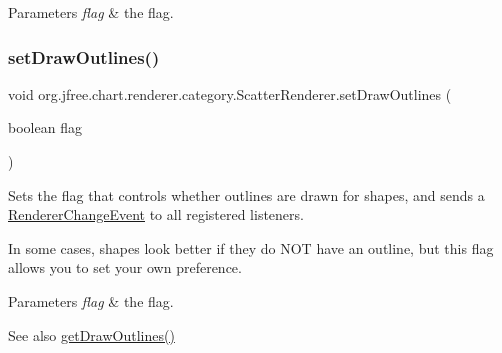 \begin{DoxyParams}{Parameters}
{\em flag} & the flag. \\
\hline
\end{DoxyParams}
\mbox{\label{classorg_1_1jfree_1_1chart_1_1renderer_1_1category_1_1_scatter_renderer_a7abfe3403b5c744918c537dcf97dd09b}} 
\subsubsection{\texorpdfstring{set\+Draw\+Outlines()}{setDrawOutlines()}}
{\footnotesize\ttfamily void org.\+jfree.\+chart.\+renderer.\+category.\+Scatter\+Renderer.\+set\+Draw\+Outlines (\begin{DoxyParamCaption}\item[{boolean}]{flag }\end{DoxyParamCaption})}

Sets the flag that controls whether outlines are drawn for shapes, and sends a \mbox{\hyperlink{}{Renderer\+Change\+Event}} to all registered listeners. 

In some cases, shapes look better if they do N\+OT have an outline, but this flag allows you to set your own preference.


\begin{DoxyParams}{Parameters}
{\em flag} & the flag.\\
\hline
\end{DoxyParams}
\begin{DoxySeeAlso}{See also}
\mbox{\hyperlink{classorg_1_1jfree_1_1chart_1_1renderer_1_1category_1_1_scatter_renderer_a0dac1c7119c34fe923357e583f3267c4}{get\+Draw\+Outlines()}} 
\end{DoxySeeAlso}
\mbox{\label{classorg_1_1jfree_1_1chart_1_1renderer_1_1category_1_1_scatter_renderer_a4415e005084f4401c7386d6fec53301e}} 
